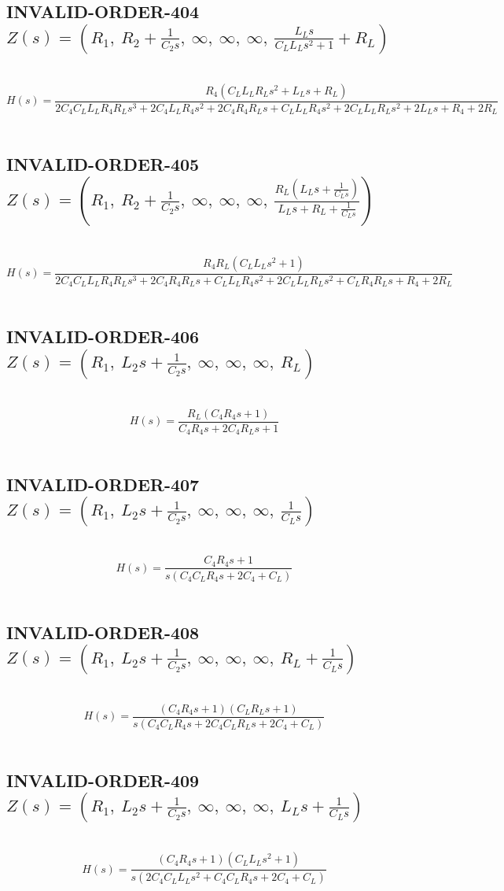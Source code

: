 \documentclass{article}
\begin{document}
\subsection{INVALID-ORDER-404 $Z(s) = \left( R_{1}, \  R_{2} + \frac{1}{C_{2} s}, \  \infty, \  \infty, \  \infty, \  \frac{L_{L} s}{C_{L} L_{L} s^{2} + 1} + R_{L}\right)$ } \ 
\textbf{\[H(s) = \frac{R_{4} \left(C_{L} L_{L} R_{L} s^{2} + L_{L} s + R_{L}\right)}{2 C_{4} C_{L} L_{L} R_{4} R_{L} s^{3} + 2 C_{4} L_{L} R_{4} s^{2} + 2 C_{4} R_{4} R_{L} s + C_{L} L_{L} R_{4} s^{2} + 2 C_{L} L_{L} R_{L} s^{2} + 2 L_{L} s + R_{4} + 2 R_{L}}\] } \ 
\subsection{INVALID-ORDER-405 $Z(s) = \left( R_{1}, \  R_{2} + \frac{1}{C_{2} s}, \  \infty, \  \infty, \  \infty, \  \frac{R_{L} \left(L_{L} s + \frac{1}{C_{L} s}\right)}{L_{L} s + R_{L} + \frac{1}{C_{L} s}}\right)$ } \ 
\textbf{\[H(s) = \frac{R_{4} R_{L} \left(C_{L} L_{L} s^{2} + 1\right)}{2 C_{4} C_{L} L_{L} R_{4} R_{L} s^{3} + 2 C_{4} R_{4} R_{L} s + C_{L} L_{L} R_{4} s^{2} + 2 C_{L} L_{L} R_{L} s^{2} + C_{L} R_{4} R_{L} s + R_{4} + 2 R_{L}}\] } \ 
\subsection{INVALID-ORDER-406 $Z(s) = \left( R_{1}, \  L_{2} s + \frac{1}{C_{2} s}, \  \infty, \  \infty, \  \infty, \  R_{L}\right)$ } \ 
\textbf{\[H(s) = \frac{R_{L} \left(C_{4} R_{4} s + 1\right)}{C_{4} R_{4} s + 2 C_{4} R_{L} s + 1}\] } \ 
\subsection{INVALID-ORDER-407 $Z(s) = \left( R_{1}, \  L_{2} s + \frac{1}{C_{2} s}, \  \infty, \  \infty, \  \infty, \  \frac{1}{C_{L} s}\right)$ } \ 
\textbf{\[H(s) = \frac{C_{4} R_{4} s + 1}{s \left(C_{4} C_{L} R_{4} s + 2 C_{4} + C_{L}\right)}\] } \ 
\subsection{INVALID-ORDER-408 $Z(s) = \left( R_{1}, \  L_{2} s + \frac{1}{C_{2} s}, \  \infty, \  \infty, \  \infty, \  R_{L} + \frac{1}{C_{L} s}\right)$ } \ 
\textbf{\[H(s) = \frac{\left(C_{4} R_{4} s + 1\right) \left(C_{L} R_{L} s + 1\right)}{s \left(C_{4} C_{L} R_{4} s + 2 C_{4} C_{L} R_{L} s + 2 C_{4} + C_{L}\right)}\] } \ 
\subsection{INVALID-ORDER-409 $Z(s) = \left( R_{1}, \  L_{2} s + \frac{1}{C_{2} s}, \  \infty, \  \infty, \  \infty, \  L_{L} s + \frac{1}{C_{L} s}\right)$ } \ 
\textbf{\[H(s) = \frac{\left(C_{4} R_{4} s + 1\right) \left(C_{L} L_{L} s^{2} + 1\right)}{s \left(2 C_{4} C_{L} L_{L} s^{2} + C_{4} C_{L} R_{4} s + 2 C_{4} + C_{L}\right)}\] } \ 
\end{document}
